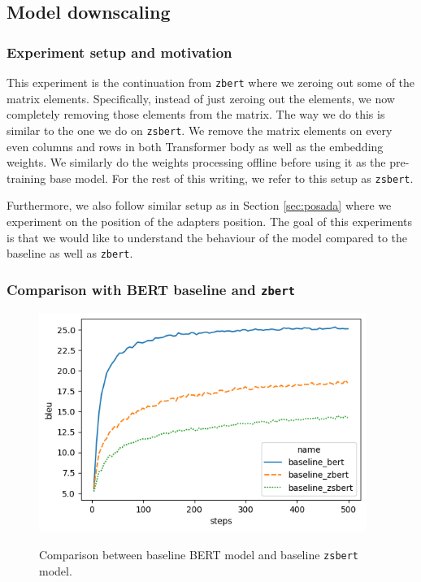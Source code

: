 \subsection{Model downscaling}
\subsubsection{Experiment setup and motivation}
This experiment is the continuation from \texttt{zbert} where we zeroing out some of the matrix elements. Specifically, instead of just zeroing out the elements, we now completely removing those elements from the matrix. The way we do this is similar to the one we do on \texttt{zsbert}. We remove the matrix elements on every even columns and rows in both Transformer body as well as the embedding weights. We similarly do the weights processing offline before using it as the pre-training base model. For the rest of this writing, we refer to this setup as \texttt{zsbert}.

Furthermore, we also follow similar setup as in Section \ref{sec:posada} where we experiment on the position of the adapters position. The goal of this experiments is that we would like to understand the behaviour of the model compared to the baseline as well as \texttt{zbert}.

\subsubsection{Comparison with BERT baseline and \texttt{zbert}}

\begin{figure}[h]
    {\includegraphics[width=0.95\textwidth]{img/baseline_zsbert.png}}
    \centering
    \caption{Comparison between baseline BERT model and baseline \texttt{zsbert} model.}
    \label{img:baseline_zsbert}
\end{figure}

